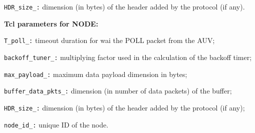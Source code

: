 \begin{description}
\begin{description}
		\item 	{\tt HDR\_size\_:} dimension (in bytes) of the header added by the protocol (if any).
	\end{description}
   \item {\bf Tcl parameters for NODE:} 
	\begin{description}
		\item  	{\tt T\_poll\_:} timeout duration for wai the POLL packet from the AUV;
		\item 	{\tt backoff\_tuner\_:} multiplying factor used in the calculation of the backoff timer;
		\item 	{\tt max\_payload\_:} maximum data payload dimension in bytes;
		\item 	{\tt buffer\_data\_pkts\_:} dimension (in number of data packets) of the buffer;
		\item 	{\tt HDR\_size\_:} dimension (in bytes) of the header added by the protocol (if any);
		\item 	{\tt node\_id\_:} unique ID of the node.
	\end{description}


\end{description}
